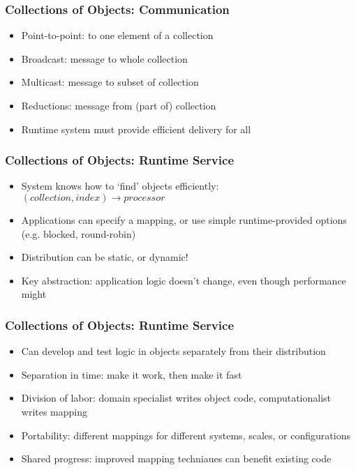 \begin{frame}[fragile]
  \frametitle{Collections of Objects: Communication}
  \begin{itemize}
    \item Point-to-point: to one element of a collection
    \item Broadcast: message to whole collection
    \item Multicast: message to subset of collection
    \item Reductions: message from (part of) collection
    \item Runtime system must provide efficient delivery for all
  \end{itemize}
\end{frame}

\begin{frame}[fragile]
  \frametitle{Collections of Objects: Runtime Service}
  \begin{itemize}
    \item System knows how to `find' objects efficiently: $(collection, index) \to processor$
    \item Applications can specify a mapping, or use simple
      runtime-provided options (e.g. blocked, round-robin)
    \item Distribution can be static, or dynamic!
    \item Key abstraction: application logic doesn't change, even
      though performance might
  \end{itemize}
\end{frame}

\begin{frame}[fragile]
  \frametitle{Collections of Objects: Runtime Service}
  \begin{itemize}
    \item Can develop and test logic in objects separately from their distribution
    \item Separation in time: make it work, then make it fast
    \item Division of labor: domain specialist writes object code, computationalist writes mapping
    \item Portability: different mappings for different systems, scales, or configurations
    \item Shared progress: improved mapping techniaues can benefit existing code
  \end{itemize}
\end{frame}




